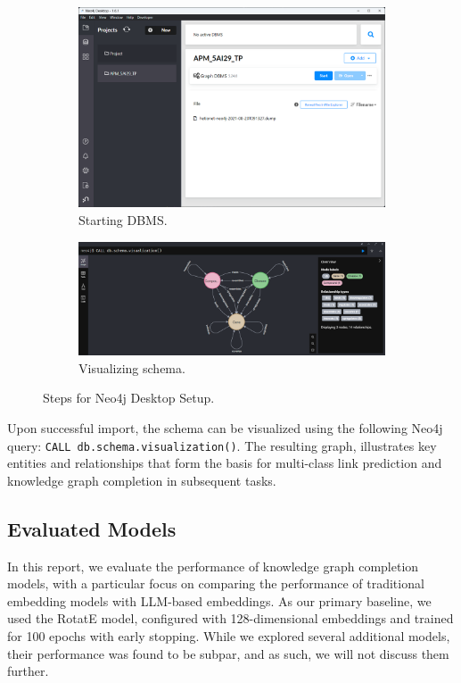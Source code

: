 \begin{figure}
\begin{subfigure}[b]{0.49\textwidth}
        \includegraphics[width=\textwidth]{images/neo4j-setup/5}
        \caption{Starting DBMS.}
    \end{subfigure}
    \hfill
    \begin{subfigure}[b]{0.49\textwidth}
        \centering
        \includegraphics[width=\textwidth]{images/neo4j-setup/7}
        \caption{Visualizing schema.}
    \end{subfigure}

    \caption{Steps for Neo4j Desktop Setup.}
    \label{fig:neo4j-setup}
\end{figure}

Upon successful import, the schema can be visualized using the following Neo4j query: \texttt{CALL db.schema.visualization()}.
The resulting graph, illustrates key entities and relationships that form the basis for multi-class link prediction and knowledge graph completion in subsequent tasks.

\subsection*{Evaluated Models}

In this report, we evaluate the performance of knowledge graph completion models, with a particular focus on comparing the performance of traditional embedding models with LLM-based embeddings.
As our primary baseline, we used the RotatE model, configured with 128-dimensional embeddings and trained for 100 epochs with early stopping.
While we explored several additional models, their performance was found to be subpar, and as such, we will not discuss them further.

